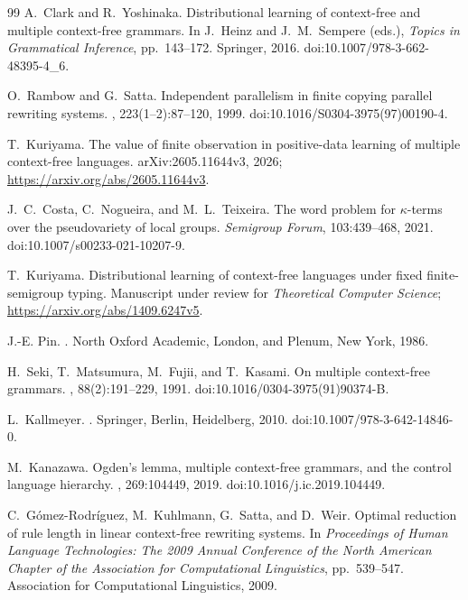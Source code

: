 \documentclass[11pt,a4paper]{ltjsarticle}
\numberwithin{equation}{section}
\theoremstyle{plain}
\theoremstyle{definition}
\theoremstyle{remark}
\theoremstyle{plain}
\begin{document}
\begin{thebibliography}{99}
A.~Clark and R.~Yoshinaka.
\newblock Distributional learning of context-free and multiple context-free grammars.
\newblock In J.~Heinz and J.~M.~Sempere (eds.), \emph{Topics in Grammatical
Inference}, pp.~143--172. Springer, 2016.
\newblock doi:10.1007/978-3-662-48395-4\_6.

O.~Rambow and G.~Satta.
\newblock Independent parallelism in finite copying parallel rewriting systems.
, 223(1--2):87--120, 1999.
\newblock doi:10.1016/S0304-3975(97)00190-4.

T.~Kuriyama.
\newblock The value of finite observation in positive-data learning
of multiple context-free languages.
\newblock arXiv:2605.11644v3, 2026;
\url{https://arxiv.org/abs/2605.11644v3}.

J.~C.~Costa, C.~Nogueira, and M.~L.~Teixeira.
\newblock The word problem for $\kappa$-terms over the
pseudovariety of local groups.
\newblock \emph{Semigroup Forum}, 103:439--468, 2021.
\newblock doi:10.1007/s00233-021-10207-9.

T.~Kuriyama.
\newblock Distributional learning of context-free languages under fixed
finite-semigroup typing.
\newblock Manuscript under review for \emph{Theoretical Computer Science};
\url{https://arxiv.org/abs/1409.6247v5}.

J.-E. Pin.
.
\newblock North Oxford Academic, London, and Plenum, New York, 1986.

H.~Seki, T.~Matsumura, M.~Fujii, and T.~Kasami.
\newblock On multiple context-free grammars.
, 88(2):191--229, 1991.
\newblock doi:10.1016/0304-3975(91)90374-B.

L.~Kallmeyer.
.
\newblock Springer, Berlin, Heidelberg, 2010.
\newblock doi:10.1007/978-3-642-14846-0.

M.~Kanazawa.
\newblock Ogden's lemma, multiple context-free grammars, and the control language hierarchy.
, 269:104449, 2019.
\newblock doi:10.1016/j.ic.2019.104449.

C.~G\'omez-Rodr\'iguez, M.~Kuhlmann, G.~Satta, and D.~Weir.
\newblock Optimal reduction of rule length in linear context-free rewriting systems.
\newblock In {\em Proceedings of Human Language Technologies: The 2009 Annual
Conference of the North American Chapter of the Association for Computational
Linguistics}, pp.~539--547. Association for Computational Linguistics, 2009.


\end{thebibliography}
\end{document}
